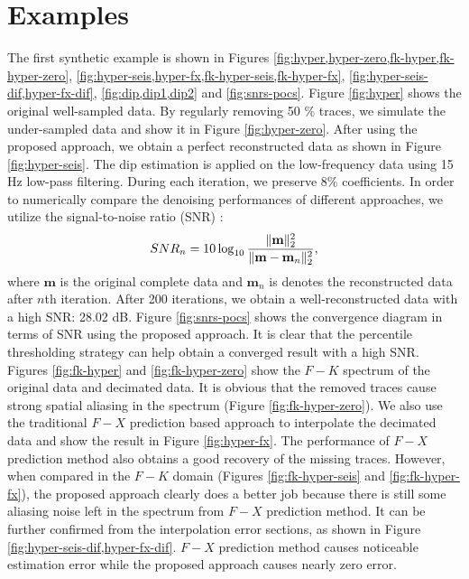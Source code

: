 \section{Examples}
The first synthetic example is shown in Figures \ref{fig:hyper,hyper-zero,fk-hyper,fk-hyper-zero}, \ref{fig:hyper-seis,hyper-fx,fk-hyper-seis,fk-hyper-fx}, \ref{fig:hyper-seis-dif,hyper-fx-dif}, \ref{fig:dip,dip1,dip2} and \ref{fig:snrs-pocs}. Figure \ref{fig:hyper} shows the original well-sampled data. By regularly removing 50 \% traces, we simulate the under-sampled data and show it in Figure \ref{fig:hyper-zero}. After using the proposed approach, we obtain a perfect reconstructed data as shown in Figure \ref{fig:hyper-seis}. The dip estimation is applied on the low-frequency data using 15 Hz low-pass filtering. During each iteration, we preserve 8\% coefficients. In order to numerically compare the denoising performances of different approaches,  we utilize the signal-to-noise ratio (SNR) \cite{yangkang2015}:
\begin{equation}
\label{eq:snr}
SNR_n=10\log_{10}\frac{\Arrowvert \mathbf{m} \Arrowvert_2^2}{\Arrowvert \mathbf{m}-\mathbf{m}_n\Arrowvert_2^2},
\end{equation}
where $\mathbf{m}$ is the original complete data and $\mathbf{m}_n$ is denotes the reconstructed data after $n$th iteration.
After 200 iterations, we obtain a well-reconstructed data with a high SNR: 28.02 dB. Figure \ref{fig:snrs-pocs} shows the convergence diagram in terms of SNR using the proposed approach. It is clear that the percentile thresholding strategy can help obtain a converged result with a high SNR. Figures \ref{fig:fk-hyper} and \ref{fig:fk-hyper-zero} show the $F-K$ spectrum of the original data and decimated data. It is obvious that the removed traces cause strong spatial aliasing in the spectrum (Figure \ref{fig:fk-hyper-zero}). We also use the traditional $F-X$ prediction based approach \cite{spitz1991} to interpolate the decimated data and show the result in Figure \ref{fig:hyper-fx}. The performance of $F-X$ prediction method also obtains a good recovery of the missing traces. However, when compared in the $F-K$ domain (Figures \ref{fig:fk-hyper-seis} and \ref{fig:fk-hyper-fx}), the proposed approach clearly does a better job because there is still some aliasing noise left in the spectrum from $F-X$ prediction method. It can be further confirmed from the interpolation error sections, as shown in Figure \ref{fig:hyper-seis-dif,hyper-fx-dif}. $F-X$ prediction method causes noticeable estimation error while the proposed approach causes nearly zero error. 

